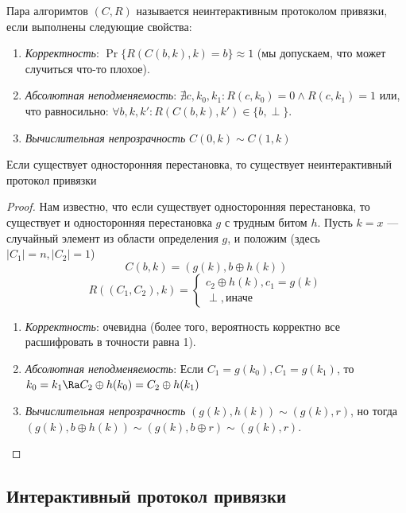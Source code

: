 \begin{definition}
    Пара алгоримтов \((C, R)\) называется неинтерактивным протоколом привязки, если выполнены следующие свойства:
    \begin{enumerate}
        \item \emph{Корректность}: \(\Pr\{R(C(b, k), k) = b\} \approx 1\) (мы допускаем, что может случиться что-то плохое).
        \item \emph{Абсолютная неподменяемость}: \(\nexists c, k_0, k_1: R(c, k_0) = 0 \wedge R(c, k_1) = 1\) или, что равносильно: \(\forall b, k, k': R(C(b, k), k') \in \{b, \perp\}\).
        \item \emph{Вычислительная непрозрачность} \(C(0, k) \sim C(1, k)\)
    \end{enumerate}
\end{definition}


\begin{theorem}
    Если существует односторонняя перестановка, то существует неинтерактивный протокол привязки
\end{theorem}
\begin{proof}
    Нам известно, что если существует односторонняя перестановка, то существует и односторонняя перестановка \(g\) с трудным битом \(h\). Пусть \(k = x\) --- случайный элемент из области определения \(g\), и положим (здесь \(|C_1| = n, |C_2| = 1\))
    \[C(b, k) = (g(k), b \oplus h(k))\]
    \[R((C_1, C_2), k) = \begin{cases}
        c_2 \oplus h(k), c_1 = g(k) \\
        \perp, \text{иначе}
    \end{cases}\]
    \begin{enumerate}
        \item \emph{Корректность}: очевидна (более того, вероятность корректно все расшифровать в точности равна 1).
        \item \emph{Абсолютная неподменяемость}: Если \(C_1 = g(k_0), C_1 = g(k_1)\), то \(k_0 = k_1 \Ra C_2 \oplus h(k_0) = C_2 \oplus h(k_1)\)
        \item \emph{Вычислительная непрозрачность} \((g(k), h(k)) \sim (g(k), r)\), но тогда \((g(k), b \oplus h(k)) \sim (g(k), b \oplus r) \sim (g(k), r)\).
    \end{enumerate}
\end{proof}

\subsection{Интерактивный протокол привязки}

